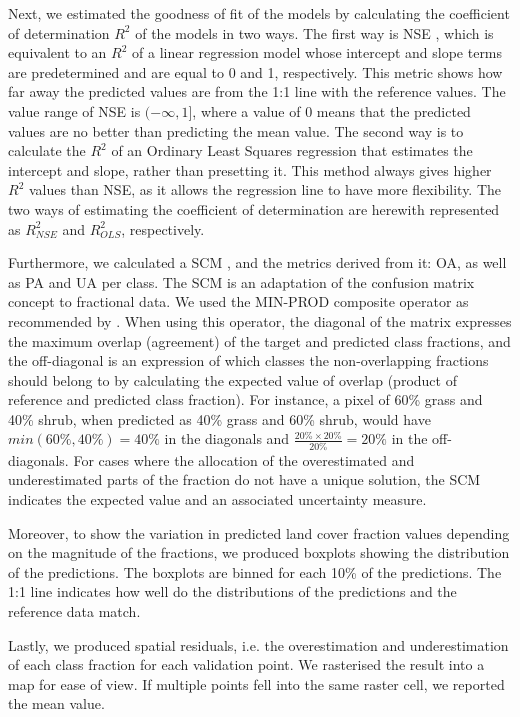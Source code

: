 \documentclass[review,authoryear,3p]{elsarticle}
\begin{document}
Next, we estimated the goodness of fit of the models by calculating the coefficient of determination $R^2$ of the models in two ways.
The first way is \gls{NSE} \citep{nash1970river}, which is equivalent to an $R^2$ of a linear regression model whose intercept and slope terms are predetermined and are equal to 0 and 1, respectively.
This metric shows how far away the predicted values are from the 1:1 line with the reference values.
The value range of \gls{NSE} is $(-\infty, 1]$, where a value of 0 means that the predicted values are no better than predicting the mean value.
The second way is to calculate the $R^2$ of an Ordinary Least Squares regression that estimates the intercept and slope, rather than presetting it.
This method always gives higher $R^2$ values than \gls{NSE}, as it allows the regression line to have more flexibility.
The two ways of estimating the coefficient of determination are herewith represented as $R^2_{NSE}$ and $R^2_{OLS}$, respectively.

Furthermore, we calculated a \gls{SCM} \citep{silvan-cardenas_sub-pixel_2008}, and the metrics derived from it: \ac{OA}, as well as \ac{PA} and \ac{UA} per class.
The \gls{SCM} is an adaptation of the confusion matrix concept to fractional data.
We used the MIN-PROD composite operator as recommended by \citet{silvan-cardenas_sub-pixel_2008}.
When using this operator, the diagonal of the matrix expresses the maximum overlap (agreement) of the target and predicted class fractions, and the off-diagonal is an expression of which classes the non-overlapping fractions should belong to by calculating the expected value of overlap (product of reference and predicted class fraction).
For instance, a pixel of 60\% grass and 40\% shrub, when predicted as 40\% grass and 60\% shrub, would have $min(60\%, 40\%)=40\%$ in the diagonals and $\frac{20\%\times20\%}{20\%}=20\%$ in the off-diagonals.
For cases where the allocation of the overestimated and underestimated parts of the fraction do not have a unique solution, the \ac{SCM} indicates the expected value and an associated uncertainty measure.

Moreover, to show the variation in predicted land cover fraction values depending on the magnitude of the fractions, we produced boxplots showing the distribution of the predictions.
The boxplots are binned for each 10\% of the predictions.
The 1:1 line indicates how well do the distributions of the predictions and the reference data match.

Lastly, we produced spatial residuals, i.e. the overestimation and underestimation of each class fraction for each validation point.
We rasterised the result into a map for ease of view.
If multiple points fell into the same raster cell, we reported the mean value.
\end{document}
